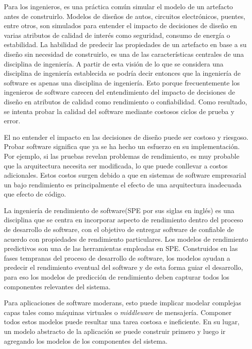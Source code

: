 \documentclass[11pt, twoside]{report}
\begin{document}
Para los ingenieros, es una práctica común simular el modelo de un artefacto antes de construirlo. Modelos de diseños de autos, circuitos electrónicos, puentes, entre otros, son simulados para entender el impacto de decisiones de diseño en varias atributos de calidad de interés como seguridad, consumo de energía o estabilidad. La habilidad de predecir las propiedades de un artefacto en base a su diseño sin necesidad de construirlo, es una de las características centrales de una disciplina de ingeniería. A partir de esta visión de lo que se considera una disciplina de ingeniería establecida se podría decir entonces que la ingeniería de software es apenas una disciplina de ingeniería\cite{palladio-blue-book}. Esto porque frecuentemente los ingenieros de software carecen del entendimiento del impacto de decisiones de diseño en atributos de calidad como rendimiento o confiabilidad. Como resultado, se intenta probar la calidad del software mediante costosos ciclos de prueba y error.

El no entender el impacto en las decisiones de diseño puede ser costoso y riesgoso. Probar software significa que ya se ha hecho un esfuerzo en su implementación. Por ejemplo, si las pruebas revelan problemas de rendimiento, es muy probable que la arquitectura necesita ser modificada, lo que puede conllevar a costos adicionales. Estos costos surgen debido a que en sistemas de software empresarial un bajo rendimiento es principalmente el efecto de una arquitectura inadecuada que efecto de código.

La ingeniería de rendimiento de software(SPE por sus siglas en inglés) es una disciplina que se centra en incorporar aspecto de rendimiento dentro del proceso de desarrollo de software, con el objetivo de entregar software de confiable de acuerdo con propiedades de rendimiento particulares. Los modelos de rendimiento predictivos son una de las herramientas empleadas en SPE. Construidos en las fases tempranas del proceso de desarrollo de software, los modelos ayudan a predecir el rendimiento eventual del software y de esta forma guiar el desarrollo, para eso los modelos de predicción de rendimiento deben capturar todos los componentes relevantes del sistema.

Para aplicaciones de software moderans, esto puede implicar modelar complejas capas tales como máquinas virtuales o \emph{middleware} de mensajería. Componer todos estos modelos puede resultar una tarea costosa e ineficiente. En su lugar, un modelo abstracto de la aplicación se puede construir primero y luego ir agregando los modelos de los componentes del sistema. 
\end{document}
